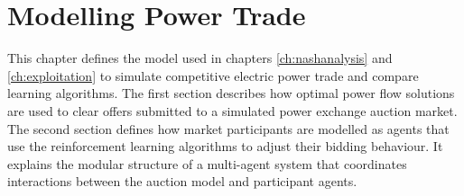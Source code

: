 \chapter{Modelling Power Trade}
\label{ch:method}
This chapter defines the model used in chapters \ref{ch:nashanalysis} and
\ref{ch:exploitation} to simulate competitive electric power trade and compare
learning algorithms. The first section describes how optimal power flow
solutions are used to clear offers submitted to a simulated power exchange
auction market. The second section defines how market participants are modelled
as agents that use the reinforcement learning algorithms to adjust their bidding
behaviour. It explains the modular structure of a multi-agent system that
coordinates interactions between the auction model and participant agents.

%
%
